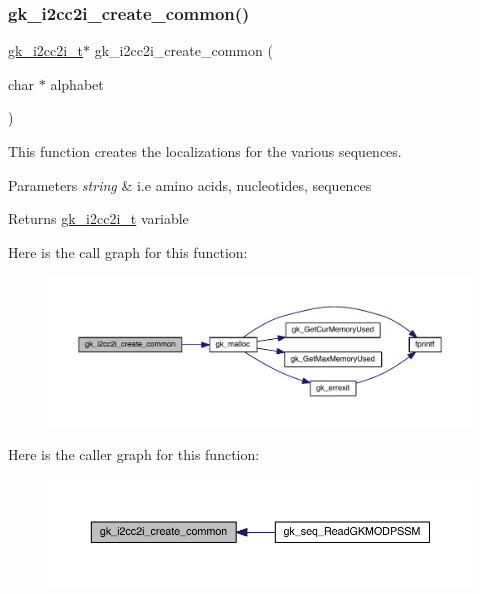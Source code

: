 \subsubsection{\texorpdfstring{gk\+\_\+i2cc2i\+\_\+create\+\_\+common()}{gk\_i2cc2i\_create\_common()}}
{\footnotesize\ttfamily \hyperlink{a00670}{gk\+\_\+i2cc2i\+\_\+t}$\ast$ gk\+\_\+i2cc2i\+\_\+create\+\_\+common (\begin{DoxyParamCaption}\item[{char $\ast$}]{alphabet }\end{DoxyParamCaption})}



This function creates the localizations for the various sequences. 


\begin{DoxyParams}{Parameters}
{\em string} & i.\+e amino acids, nucleotides, sequences \\
\hline
\end{DoxyParams}
\begin{DoxyReturn}{Returns}
\hyperlink{a00670}{gk\+\_\+i2cc2i\+\_\+t} variable 
\end{DoxyReturn}
Here is the call graph for this function\+:\nopagebreak
\begin{figure}[H]
\begin{center}
\leavevmode
\includegraphics[width=350pt]{a00077_a8b9f1e33d58df397a7f0f923a25ec256_cgraph}
\end{center}
\end{figure}
Here is the caller graph for this function\+:\nopagebreak
\begin{figure}[H]
\begin{center}
\leavevmode
\includegraphics[width=350pt]{a00077_a8b9f1e33d58df397a7f0f923a25ec256_icgraph}
\end{center}
\end{figure}
\mbox{\label{a00077_a77fbfda4552002a94111aa6321c6493e}} 
